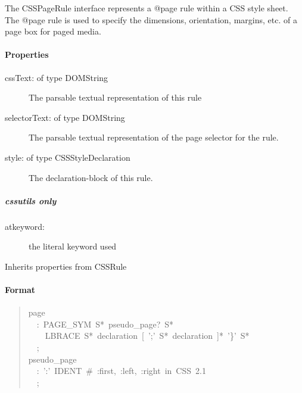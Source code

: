 The CSSPageRule interface represents a @page rule within a CSS style
sheet. The @page rule is used to specify the dimensions, orientation,
margins, etc. of a page box for paged media.



\hypertarget{properties}{}
\paragraph*{Properties}
\label{properties}
\begin{description}
\item[{cssText: of type DOMString}] \leavevmode 
The parsable textual representation of this rule

\item[{selectorText: of type DOMString}] \leavevmode 
The parsable textual representation of the page selector for the rule.

\item[{style: of type CSSStyleDeclaration}] \leavevmode 
The declaration-block of this rule.

\end{description}



\hypertarget{cssutils-only}{}
\subparagraph*{cssutils only}
\label{cssutils-only}
\begin{description}
\item[{atkeyword:}] \leavevmode 
the literal keyword used

\end{description}

Inherits properties from CSSRule



\hypertarget{format}{}
\paragraph*{Format}
\label{format}
\begin{quote}{\ttfamily \raggedright \noindent
page~\\
~~:~PAGE{\_}SYM~S*~pseudo{\_}page?~S*~\\
~~~~LBRACE~S*~declaration~{[}~';'~S*~declaration~{]}*~'{\}}'~S*~\\
~~;~\\
pseudo{\_}page~\\
~~:~':'~IDENT~{\#}~:first,~:left,~:right~in~CSS~2.1~\\
~~;
}\end{quote}

